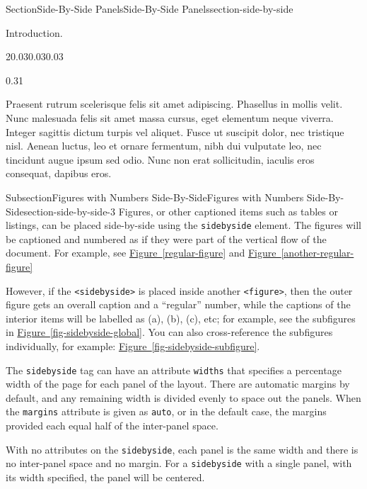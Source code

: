 \documentclass[twoside,10pt,]{article}
\newcommand{\xreffont}{\relax}
\newcommand{\mono}[1]{\texttt{#1}}
\numberwithin{equation}{section}
\begin{document}
\begin{sectionptx}{Section}{Side-By-Side Panels}{}{Side-By-Side Panels}{}{}{section-side-by-side}
\begin{introduction}{Introduction.}
\begin{sidebyside}{2}{0.03}{0.03}{0.03}
\begin{sbspanel}{0.31}%
\par
Praesent rutrum scelerisque felis sit amet adipiscing. Phasellus in mollis velit. Nunc malesuada felis sit amet massa cursus, eget elementum neque viverra. Integer sagittis dictum turpis vel aliquet. Fusce ut suscipit dolor, nec tristique nisl. Aenean luctus, leo et ornare fermentum, nibh dui vulputate leo, nec tincidunt augue ipsum sed odio. Nunc non erat sollicitudin, iaculis eros consequat, dapibus eros.%
\end{sbspanel}%
\end{sidebyside}%
\end{introduction}%
%
%
\typeout{************************************************}
\typeout{************************************************}
%
\begin{subsectionptx}{Subsection}{Figures with Numbers Side-By-Side}{}{Figures with Numbers Side-By-Side}{}{}{section-side-by-side-3}
Figures, or other captioned items such as tables or listings, can be placed side-by-side using the \mono{sidebyside} element.  The figures will be captioned and numbered as if they were part of the vertical flow of the document.  For example, see \hyperref[regular-figure]{Figure~{\xreffont\ref{regular-figure}}} and \hyperref[another-regular-figure]{Figure~{\xreffont\ref{another-regular-figure}}}%
\par
However, if the \mono{<sidebyside>} is placed inside another \mono{<figure>}, then the outer figure gets an overall caption and a ``regular'' number, while the captions of the interior items will be labelled as (a), (b), (c), etc; for example, see the subfigures in \hyperref[fig-sidebyside-global]{Figure~{\xreffont\ref{fig-sidebyside-global}}}. You can also cross-reference the subfigures individually, for example: \hyperref[fig-sidebyside-subfigure]{Figure~{\xreffont\ref{fig-sidebyside-subfigure}}}.%
\par
The \mono{sidebyside} tag can have an attribute \mono{widths} that specifies a percentage width of the page for each panel of the layout.  There are automatic margins by default, and any remaining width is divided evenly to space out the panels.  When the \mono{margins} attribute is given as \mono{auto}, or in the default case, the margins provided each equal half of the inter-panel space.%
\par
With no attributes on the \mono{sidebyside}, each panel is the same width and there is no inter-panel space and no margin.  For a \mono{sidebyside} with a single panel, with its width specified, the panel will be centered.%

\end{subsectionptx}
\end{sectionptx}
\end{document}
